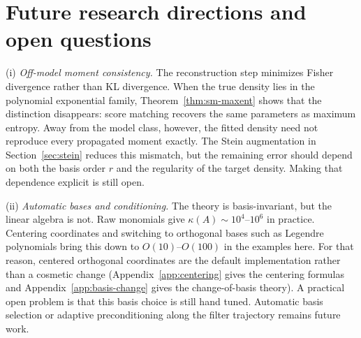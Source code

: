\documentclass{article}
\theoremstyle{definition}
\begin{document}
\section{Future research directions and open questions}
\label{app:limitations}

(i) \emph{Off-model moment consistency.}
The reconstruction step minimizes Fisher divergence rather than KL
divergence. When the true density lies in the polynomial exponential
family, Theorem~\ref{thm:sm-maxent} shows that the distinction
disappears: score matching recovers the same parameters as maximum
entropy. Away from the model class, however, the fitted density need
not reproduce every propagated moment exactly. The Stein augmentation
in Section~\ref{sec:stein} reduces this mismatch, but the remaining
error should depend on both the basis order $r$ and the regularity of
the target density. Making that dependence explicit is still open.

(ii) \emph{Automatic bases and conditioning.}
The theory is basis-invariant, but the linear algebra is not.
Raw monomials give $\kappa(A) \sim 10^4$--$10^6$ in practice.
Centering coordinates and switching to orthogonal bases such as
Legendre polynomials bring this down to $O(10)$--$O(100)$ in the
examples here. For that reason, centered orthogonal coordinates are the
default implementation rather than a cosmetic change
(Appendix~\ref{app:centering} gives the centering formulas and
Appendix~\ref{app:basis-change} gives the change-of-basis theory).
A practical open problem is that this basis choice is still hand tuned.
Automatic basis selection or adaptive preconditioning along the filter
trajectory remains future work.
\end{document}

